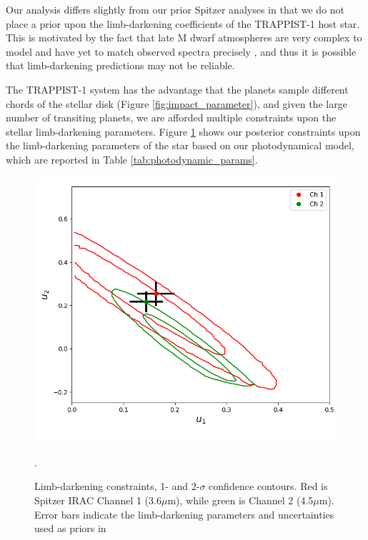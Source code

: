 \documentclass[fleqn,usenatbib]{mnras} %
\begin{document}
Our analysis differs slightly from our prior Spitzer analyses \citep{Delrez2018a,Ducrot2020} in that we do not place a prior upon the limb-darkening coefficients of the TRAPPIST-1 host star.  This is motivated by the fact that late M dwarf atmospheres are very complex to model and have yet to match observed spectra precisely \citep{Allard2011,Allard2012,Juncher2017}, and thus it is possible that limb-darkening predictions may not be reliable.

The TRAPPIST-1 system has the advantage that the planets sample different chords of the stellar disk (Figure \ref{fig:impact_parameter}), and given the large number of transiting planets, we are afforded multiple constraints upon the stellar limb-darkening parameters.  Figure \ref{fig:limb_darkening} shows our posterior constraints upon the limb-darkening parameters of the star based on our photodynamical model, which are reported in Table \ref{tab:photodynamic_params}.

\begin{figure}
    \centering
    \includegraphics[width=\hsize]{figures/limb_darkening_nouprior.png}
    \caption{Limb-darkening constraints, 1- and 2-$\sigma$ confidence contours.  Red is Spitzer IRAC Channel 1 (3.6$\mu$m), while green is Channel 2 (4.5$\mu$m).  Error bars indicate the limb-darkening parameters and uncertainties used as priors in \citet{Ducrot2020}}.
    \label{fig:limb_darkening}
\end{figure}
\end{document}
